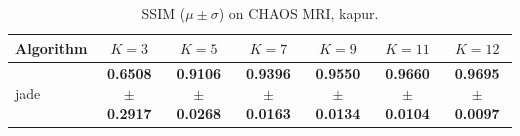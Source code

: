 \begin{table}[htbp]
\centering
\caption{SSIM ($\mu \pm \sigma$) on CHAOS MRI, kapur.}
\label{tab:exp2-kapur-ssim}
\begin{tabular}{lcccccc}
\toprule
Algorithm & $K=3$ & $K=5$ & $K=7$ & $K=9$ & $K=11$ & $K=12$ \\
\midrule
jade & \textbf{0.6508 $\pm$ 0.2917} & \textbf{0.9106 $\pm$ 0.0268} & \textbf{0.9396 $\pm$ 0.0163} & \textbf{0.9550 $\pm$ 0.0134} & \textbf{0.9660 $\pm$ 0.0104} & \textbf{0.9695 $\pm$ 0.0097} \\
\bottomrule
\end{tabular}
\end{table}